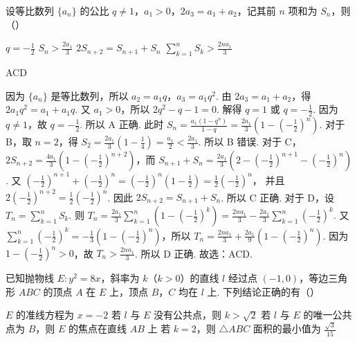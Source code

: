 \begin{problem}
设等比数列 \(\{a_n\}\) 的公比 \(q\ne 1\)，\(a_1>0\)，\(2a_3=a_1+a_2\)，记其前 \(n\) 项和为 \(S_n\)，则（\quad）

\choices
    {\(q=-\frac{1}{2}\)}
    {\(S_n>\frac{2a_1}{3}\)}
    {\(2S_{n+2}=S_{n+1}+S_n\)}
    {\(\sum_{k=1}^{n} S_k>\frac{2na_1}{3}\)}
\end{problem}

\begin{answer}
ACD
\end{answer}

\begin{solution}
因为 \(\{a_n\}\) 是等比数列，所以 \(a_2=a_1q\)，\(a_3=a_1q^2\). 由 \(2a_3=a_1+a_2\)，得 \(2a_1q^2=a_1+a_1q\). 又 \(a_1>0\)，所以 \(2q^2-q-1=0\). 解得 \(q=1\) 或 \(q=-\frac{1}{2}\). 因为 \(q\ne 1\)，故 \(q=-\frac{1}{2}\). 所以 A 正确.
此时 \(S_n=\frac{a_1\left( 1-q^n \right)}{1-q}=\frac{2a_1}{3}\left( 1-\left( -\frac{1}{2} \right)^n \right)\).
对于 B，取 \(n=2\)，得 \(S_2=\frac{2a_1}{3}\left( 1-\frac{1}{4} \right)=\frac{a_1}{2}<\frac{2a_1}{3}\). 所以 B 错误.
对于 C，\(2S_{n+2}=\frac{4a_1}{3}\left( 1-\left( -\frac{1}{2} \right)^{n+2} \right)\)，而 \(S_{n+1}+S_n=\frac{2a_1}{3}\left( 2-\left( -\frac{1}{2} \right)^{n+1}-\left( -\frac{1}{2} \right)^n \right)\). 又 \(\left( -\frac{1}{2} \right)^{n+1}+\left( -\frac{1}{2} \right)^n=\left( -\frac{1}{2} \right)^n\left( 1-\frac{1}{2} \right)=\frac{1}{2}\left( -\frac{1}{2} \right)^n\)，
并且 \(2\left( -\frac{1}{2} \right)^{n+2}=\frac{1}{2}\left( -\frac{1}{2} \right)^n\). 因此 \(2S_{n+2}=S_{n+1}+S_n\). 所以 C 正确.
对于 D，设 \(T_n=\sum_{k=1}^{n} S_k\). 则 \(T_n=\frac{2a_1}{3}\sum_{k=1}^{n}\left( 1-\left( -\frac{1}{2} \right)^k \right)=\frac{2na_1}{3}-\frac{2a_1}{3}\sum_{k=1}^{n}\left( -\frac{1}{2} \right)^k\).
又 \(\sum_{k=1}^{n}\left( -\frac{1}{2} \right)^k=-\frac{1}{3}\left( 1-\left( -\frac{1}{2} \right)^n \right)\)，所以 \(T_n=\frac{2na_1}{3}+\frac{2a_1}{9}\left( 1-\left( -\frac{1}{2} \right)^n \right)\). 因为 \(1-\left( -\frac{1}{2} \right)^n>0\)，故 \(T_n>\frac{2na_1}{3}\). 所以 D 正确.
故选：ACD.
\end{solution}

\begin{problem}
已知抛物线 \(E:y^2=8x\)，斜率为 \(k\)（\(k>0\)）的直线 \(l\) 经过点 \(\left( -1,0 \right)\)，等边三角形 \(ABC\) 的顶点 \(A\) 在 \(E\) 上，顶点 \(B\)，\(C\) 均在 \(l\) 上. 下列结论正确的有（\quad）

\choices
    {\(E\) 的准线方程为 \(x=-2\)}
    {若 \(l\) 与 \(E\) 没有公共点，则 \(k>\sqrt{2}\)}
    {若 \(l\) 与 \(E\) 的唯一公共点为 \(B\)，则 \(E\) 的焦点在直线 \(AB\) 上}
    {若 \(k=2\)，则 \(\triangle ABC\) 面积的最小值为 \(\frac{\sqrt{3}}{15}\)}
\end{problem}

